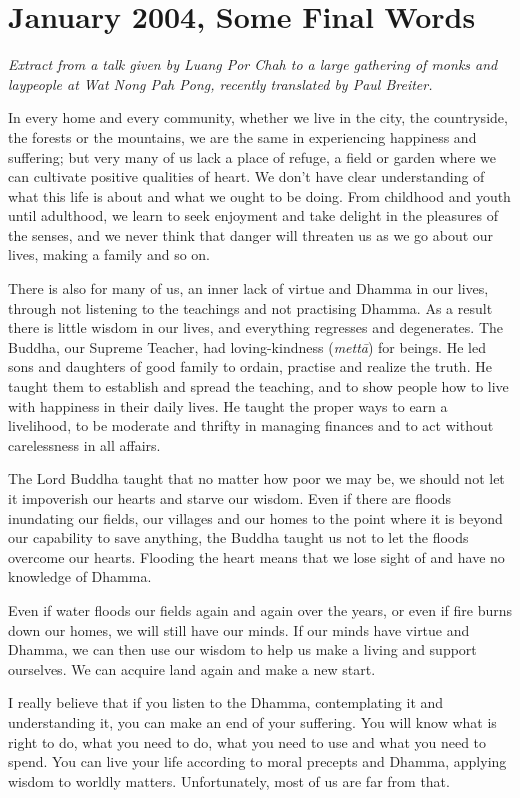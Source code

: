 \chapter{January 2004, Some Final Words}

\emph{Extract from a talk given by Luang Por Chah to a large gathering
of monks and laypeople at Wat Nong Pah Pong, recently translated by Paul
Breiter.}

In every home and every community, whether we live in the city, the
countryside, the forests or the mountains, we are the same in
experiencing happiness and suffering; but very many of us lack a place
of refuge, a field or garden where we can cultivate positive qualities
of heart. We don't have clear understanding of what this life is about
and what we ought to be doing. From childhood and youth until adulthood,
we learn to seek enjoyment and take delight in the pleasures of the
senses, and we never think that danger will threaten us as we go about
our lives, making a family and so on.

There is also for many of us, an inner lack of virtue and Dhamma in our
lives, through not listening to the teachings and not practising Dhamma.
As a result there is little wisdom in our lives, and everything
regresses and degenerates. The Buddha, our Supreme Teacher, had
loving-kindness (\emph{mettā}) for beings. He led sons and daughters of
good family to ordain, practise and realize the truth. He taught them to
establish and spread the teaching, and to show people how to live with
happiness in their daily lives. He taught the proper ways to earn a
livelihood, to be moderate and thrifty in managing finances and to act
without carelessness in all affairs.

The Lord Buddha taught that no matter how poor we may be, we should not
let it impoverish our hearts and starve our wisdom. Even if there are
floods inundating our fields, our villages and our homes to the point
where it is beyond our capability to save anything, the Buddha taught us
not to let the floods overcome our hearts. Flooding the heart means that
we lose sight of and have no knowledge of Dhamma.

Even if water floods our fields again and again over the years, or even
if fire burns down our homes, we will still have our minds. If our minds
have virtue and Dhamma, we can then use our wisdom to help us make a
living and support ourselves. We can acquire land again and make a new
start.

I really believe that if you listen to the Dhamma, contemplating it and
understanding it, you can make an end of your suffering. You will know
what is right to do, what you need to do, what you need to use and what
you need to spend. You can live your life according to moral precepts
and Dhamma, applying wisdom to worldly matters. Unfortunately, most of
us are far from that.


